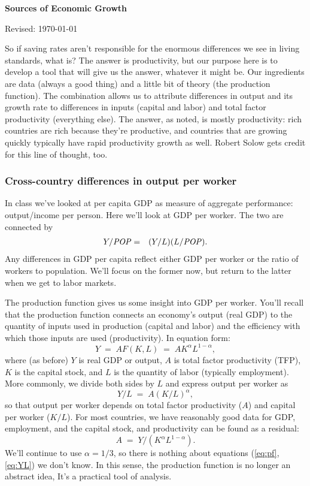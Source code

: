 \documentclass[letterpaper,12pt]{article}
\newcommand{\POP}{\mbox{\em POP\/}}
\begin{document}
\thispagestyle{empty}%
\Head

\centerline{\large \bf Sources of Economic Growth}%
\centerline{Revised:  \today}

\bigskip
So if saving rates aren't responsible for 
the enormous differences we see in living standards, what is?  
The answer is productivity, but our purpose here is to develop 
a tool that will give us the answer, whatever it might be.  
Our ingredients are data (always a good thing)
and a little bit of theory (the production function).  
The combination allows us to attribute differences in output and its
growth rate to differences in inputs (capital and labor) 
and total factor productivity (everything else).
The answer, as noted, is mostly productivity:
rich countries are rich because they're productive, 
and countries that are growing quickly typically
have rapid productivity growth as well.  
Robert Solow gets credit for this line of thought, too.


\subsubsection*{Cross-country differences in output per worker}

In class we've looked at per capita GDP as measure 
of aggregate performance:  output/income per person.
Here we'll look at GDP per worker.  The two are connected by 
\begin{eqnarray*}
    Y/\POP &=& (Y/L) (L/\POP) .
\end{eqnarray*}
Any differences in GDP per capita reflect either GDP per worker
or the ratio of workers to population.  
We'll focus on the former now, but return to the latter 
when we get to labor markets.  

The production function gives us some insight into 
GDP per worker.  
You'll recall that the production function connects an economy's output 
(real GDP)
to the quantity of inputs used in production (capital and labor) 
and the efficiency with which those inputs are used (productivity).
In equation form:  
\begin{equation}
    Y \;=\; A F(K,L) \;=\; A K^\alpha L^{1-\alpha},
    \label{eq:pf}
\end{equation}
where (as before)
$Y$ is real GDP or output,
$A$ is total factor productivity (TFP),
$K$ is the capital stock,
and $L$ is the quantity of labor (typically employment).
More commonly, we divide both sides by $L$ and
express output per worker as
\begin{equation}
    Y/L \;=\;  A (K/L)^\alpha ,
    \label{eq:YL}
\end{equation}
so that output per worker depends on total factor productivity
($A$) and capital per worker ($K/L$).
For most countries, we have reasonably good data for GDP,
employment, and the capital stock,
and productivity can be found as a residual:
\[
    A \;=\; {Y}/(K^\alpha L^{1-\alpha}) .
\]
We'll continue to use $\alpha = 1/3$, so there is nothing about
equations (\ref{eq:pf},\ref{eq:YL}) we don't know.
In this sense, the production function is no longer an abstract idea,
It's a practical tool of analysis.
\end{document}

